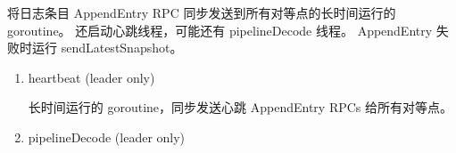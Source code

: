 \begin{enumerate}
				将日志条目 AppendEntry RPC 同步发送到所有对等点的长时间运行的 goroutine。 还启动心跳线程，可能还有 pipelineDecode 线程。 AppendEntry 失败时运行 sendLatestSnapshot。
				
				\begin{enumerate}
				
					\item heartbeat (leader only) 
					
					长时间运行的 goroutine，同步发送心跳 AppendEntry RPCs 给所有对等点。

					\item pipelineDecode (leader only)
										
				\end{enumerate}

			\end{enumerate}

	
		
		


    
 \clearpage